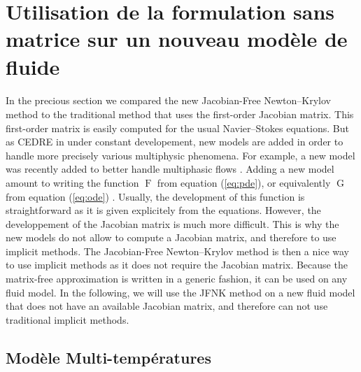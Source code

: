   \section{Utilisation de la formulation sans matrice sur un nouveau modèle de fluide}

    \paragraph{}
    In the precious section we compared the new Jacobian-Free Newton--Krylov method to the traditional method that uses the first-order Jacobian matrix.
    This first-order matrix is easily computed for the usual Navier--Stokes equations.
    But as CEDRE in under constant developement, new models are added in order to handle more precisely various multiphysic phenomena.
    For example, a new model was recently added to better handle multiphasic flows .
    Adding a new model amount to writing the function $\operatorname{F}$ from equation (\ref{eq:pde}), or equivalently $\operatorname{G}$ from equation (\ref{eq:ode}) .
    Usually, the development of this function is straightforward as it is given explicitely from the equations.
    However, the developpement of the Jacobian matrix is much more difficult.
    This is why the new models do not allow to compute a Jacobian matrix, and therefore to use implicit methods.
    The Jacobian-Free Newton--Krylov method is then a nice way to use implicit methods as it does not require the Jacobian matrix.
    Because the matrix-free approximation is written in a generic fashion, it can be used on any fluid model.
    In the following, we will use the JFNK method on a new fluid model that does not have an available Jacobian matrix, and therefore can not use traditional implicit methods.


    \subsection{Modèle Multi-températures}

